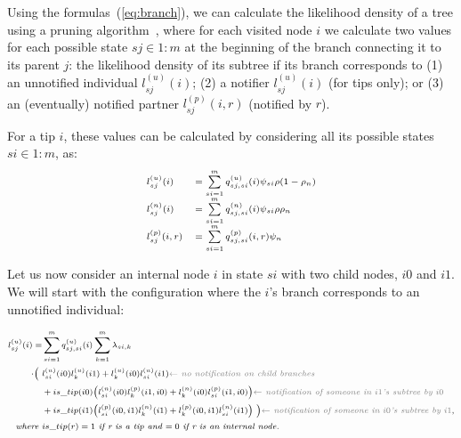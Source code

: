 \documentclass[a4paper,10pt]{article}
\begin{document}
Using the formulas~(\ref{eq:branch}), we can calculate the likelihood density of a tree using a pruning algorithm~\cite{10.1093/sysbio/22.3.240}, where for each visited node $i$ we calculate two values for each possible state $sj \in 1:m$ at the beginning of the branch connecting it to its parent $j$: the likelihood density of its subtree if its branch corresponds to (1) an unnotified individual $l^{(u)}_{sj}(i)$; (2) a notifier $l^{(u)}_{sj}(i)$ (for tips only); or (3) an (eventually) notified partner $l^{(p)}_{sj}(i, r)$ (notified by $r$).

For a tip $i$, these values can be calculated by considering all its possible states $si \in 1:m$, as:
\begin{equation}
\scriptsize
\begin{array}{ll}
l^{(u)}_{sj}(i) &= \sum\limits_{si=1}^{m} q^{(u)}_{sj,si}(i)\psi_{si}\rho (1-\rho_{n})\\
l^{(n)}_{sj}(i) &= \sum\limits_{si=1}^{m} q^{(n)}_{sj,si}(i)\psi_{si}\rho \rho_{n}\\
l^{(p)}_{sj}(i, r) &= \sum\limits_{si=1}^{m} q^{(p)}_{sj,si}(i,r)\psi_{n}\\
\end{array}
\label{eq:tip}
\end{equation}

Let us now consider an internal node $i$ in state $si$ with two child nodes, $i0$ and $i1$. We will start with the configuration where the $i$'s branch corresponds to an unnotified individual:

\begin{equation}
\scriptsize
\begin{split}
l^{(u)}_{sj}(i) = &\sum\limits_{si=1}^{m}q^{(u)}_{sj,si}(i) \sum\limits_{k=1}^{m} \lambda_{si,k} \\
\cdot \Big(~&
l^{(u)}_{si}(i0)l^{(u)}_{k}(i1) + l^{(u)}_{k}(i0)l^{(u)}_{si}(i1)  \textit{\color{gray} $\leftarrow$ no notification on child branches} \\
& + is\_tip(i0) \big(l^{(n)}_{si}(i0)l^{(p)}_{k}(i1,i0) + l^{(n)}_{k}(i0)l^{(p)}_{si}(i1,i0) \big)\textit{\color{gray} $\leftarrow$ notification of someone in $i1$'s subtree by $i0$} \\
&+ is\_tip(i1) \big(l^{(p)}_{si}(i0,i1)l^{(n)}_{k}(i1) + l^{(p)}_{k}(i0,i1)l^{(n)}_{si}(i1) \big)~\Big) \textit{\color{gray} $\leftarrow$ notification of someone in $i0$'s subtree by $i1$},\\
\textit{where } & is\_tip(r) = 1 \textit{ if r is a tip and $= 0$ if r is an internal node.}
\end{split}\label{eq:lu}
\end{equation}
\end{document}
